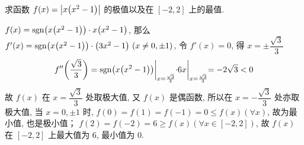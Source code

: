     

\begin{example}
    求函数 $f(x)=\qty|x\qty(x^2-1)|$ 的极值以及在 $[-2,2]$ 上的最值.
\end{example}
\begin{solution}
    $f(x)=\mathrm{sgn}\qty(x\qty(x^2-1))\cdot x\qty(x^2-1)$, 那么 $f'(x)=\mathrm{sgn}\qty(x\qty(x^2-1))\cdot\qty(3x^2-1)~ (x\neq0,\pm1)$, 令 $f'(x)=0$, 得
    $x=\pm\dfrac{\sqrt{3}}{3}$
    $$f''\qty(\dfrac{\sqrt{3}}{3})=\mathrm{sgn}\qty(x\qty(x^2-1))\biggl |_{x=\frac{\sqrt{3}}{3}}\cdot 6x\biggl |_{x=\frac{\sqrt{3}}{3}}=-2\sqrt{3}<0$$
    故 $f(x)$ 在 $x=\dfrac{\sqrt{3}}{3}$ 处取极大值, 又 $f(x)$ 是偶函数, 所以在 $x=-\dfrac{\sqrt{3}}{3}$ 处亦取极大值, 
    当 $x=0,\pm1$ 时, $f(0)=f(1)=f(-1)=0\leqslant f(x)(\forall x)$, 故为最小值, 也是极小值；
    $f(2)=f(-2)=6\geqslant f(x)(\forall x\in[-2,2])$, 故 $f(x)$ 在 $[-2,2]$ 上最大值为 $6$, 最小值为 $0$.
\end{solution}

